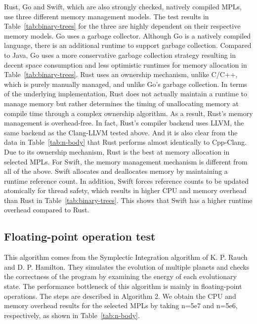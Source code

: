 Rust, Go and Swift, which are also strongly checked, natively compiled MPLs,
use three different memory management models.
The test results in Table~\ref{tab:binary-trees} for the three are highly dependent on their
respective memory models.
Go uses a garbage collector.
Although Go is a natively compiled language, there is an additional runtime to support garbage collection.
Compared to Java, Go uses a more conservative garbage collection strategy
resulting in decent space consumption and less optimistic runtimes for memory
allocation in Table~\ref{tab:binary-trees}.
Rust uses an ownership mechanism,
unlike C/C++, which is purely manually managed, and unlike Go's garbage collection.
In terms of the underlying implementation, Rust does not actually maintain a runtime
to manage memory but rather determines the timing of unallocating memory at compile
time through a complex ownership algorithm.
As a result, Rust's memory management is overhead-free.
In fact, Rust's compiler backend uses LLVM, the same
backend as the Clang-LLVM tested above.
And it is also clear from the data in Table~\ref{tab:n-body} that
Rust performs almost identically to Cpp-Clang.
Due to its ownership mechanism, Rust is the best at memory allocation in selected MPLs.
For Swift, the memory management mechanism is different from all of the above.
Swift allocates and deallocates memory by maintaining a runtime reference count.
In addition, Swift forces reference counts to be updated atomically for thread safety,
which results in higher CPU and memory overhead than Rust in Table~\ref{tab:binary-trees}.
This shows that Swift has a higher runtime overhead compared to Rust.

\subsection{Floating-point operation test}

This algorithm comes from the Symplectic Integration algorithm of K. P. Rauch and D. P. Hamilton.
They simulates the evolution of multiple planets and checks the correctness of the program
by examining the energy of each evolutionary state.
The performance bottleneck of this algorithm is mainly in floating-point operations.
The steps are described in Algorithm 2.
We obtain the CPU and memory overhead results
for the selected MPLs by taking n=5e7 and n=5e6, respectively,
as shown in Table~\ref{tab:n-body}.

